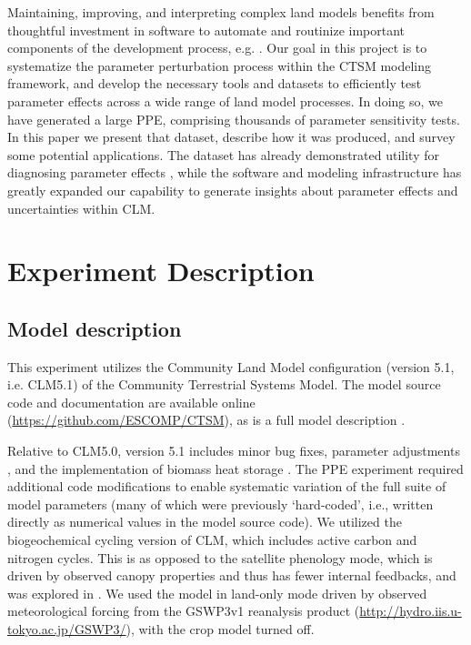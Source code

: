 \documentclass[draft]{agujournal2019}
\begin{document}
Maintaining, improving, and interpreting complex land models benefits from thoughtful investment in software to automate and routinize important components of the development process, e.g. . 
Our goal in this project is to systematize the parameter perturbation process within the CTSM modeling framework, and develop the necessary tools and datasets to efficiently test parameter effects across a wide range of land model processes. 
In doing so, we have generated a large PPE, comprising thousands of parameter sensitivity tests.
In this paper we present that dataset, describe how it was produced, and survey some potential applications.
The dataset has already demonstrated utility for diagnosing parameter effects \cite{cheng2023,yan2023a,yan2023b}, while the software and modeling infrastructure has greatly expanded our capability to generate insights about parameter effects and uncertainties within CLM.




\section{Experiment Description}
\label{methods}
\subsection{Model description}
\label{sect:md}
This experiment utilizes the Community Land Model configuration (version 5.1, i.e. CLM5.1) of the Community Terrestrial Systems Model. The model source code and documentation are available online (\url{https://github.com/ESCOMP/CTSM}), as is a full model description \cite{lawrence2019}.

Relative to CLM5.0, version 5.1 includes minor bug fixes, parameter adjustments \cite{birch2021}, and the implementation of biomass heat storage \cite{swenson2019}. The PPE experiment required additional code modifications to enable systematic variation of the full suite of model parameters (many of which were previously `hard-coded', i.e., written directly as numerical values in the model source code). We utilized the biogeochemical cycling version of CLM, which includes active carbon and nitrogen cycles. This is as opposed to the satellite phenology mode, which is driven by observed canopy properties and thus has fewer internal feedbacks, and was explored in . We used the model in land-only mode driven by observed meteorological forcing from the GSWP3v1 reanalysis product (\url{http://hydro.iis.u-tokyo.ac.jp/GSWP3/}), with the crop model turned off.
\end{document}
